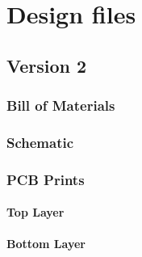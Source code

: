 \chapter{Design files}\label{ch:appendix-design}


\section{Version 2}\label{sec:appendix-v2}

\subsection{Bill of Materials}\label{sub:bom-v2}

\subsection{Schematic}\label{sub:schem-v2}

\subsection{PCB Prints}\label{sub:prints-v2}

\subsubsection{Top Layer}\label{sub2:top-v2}
\subsubsection{Bottom Layer}\label{sub2:bottom-v2}


